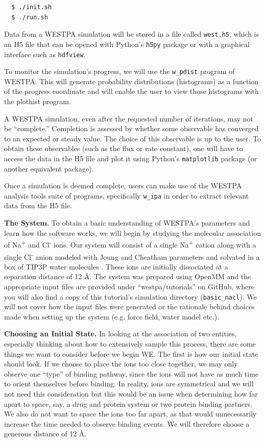 \begin{verbatim}
  $ ./init.sh
  $ ./run.sh
\end{verbatim}

Data from a WESTPA simulation will be stored in a file called \verb|west.h5|, which is an H5 file that can be opened with Python’s \verb|h5py| package or with a graphical interface such as \verb|hdfview|.

To monitor the simulation’s progress, we will use  the \verb|w_pdist| program of WESTPA. 
This will generate probability distributions (histograms) as a function of the progress coordinate and will enable the user to view those histograms with the plothist program. 

A WESTPA simulation, even after the requested number of iterations, may not be “complete.”  
Completion is assessed by whether some observable has converged to an expected or steady value. 
The choice of this observable is up to the user. 
To obtain these observables (such as the flux or rate constant), one will have to access the data in the H5 file and plot it using Python’s \verb|matplotlib| package (or another equivalent package).

Once a simulation is deemed complete, users can make use of the WESTPA analysis tools suite of programs, specifically \verb|w_ipa| in order to extract relevant data from the H5 file.

\textbf{The System.} To obtain a basic understanding of WESTPA’s parameters and learn how the software works, we will begin by studying the molecular association of Na\textsuperscript{+} and Cl\textsuperscript{-} ions. 
Our system will consist of a single Na\textsuperscript{+} cation along with a single Cl\textsuperscript{-} anion modeled with Joung and Cheatham parameters \citep{JoungCheatham2009} and solvated in a box of TIP3P water molecules \citep{tip3p}. 
These ions are initially dissociated at a separation distance of 12 \AA. 
The system was prepared using OpenMM and the appropriate input files are provided under “westpa/tutorials” on GitHub, where you will also find a copy of this tutorial’s simulation directory (\verb|basic_nacl|). 
We will not cover how the input files were generated or the rationale behind choices made when setting up the system (e.g. force field, water model etc.).


\textbf{Choosing an Initial State.} In looking at the association of two entities, especially thinking about how to extensively sample this process, there are some things we want to consider before we begin WE.
The first is how our initial state should look. If we choose to place the ions too close together, we may only observe one “type” of binding pathway, since the ions will not have as much time to orient themselves before binding. 
In reality, ions are symmetrical and we will not need this consideration but this would be an issue when determining how far apart to space, say, a drug and protein system or two protein binding partners. 
We also do not want to space the ions too far apart, as that would unnecessarily increase the time needed to observe binding events. 
We will therefore choose a generous distance of 12 \AA.

